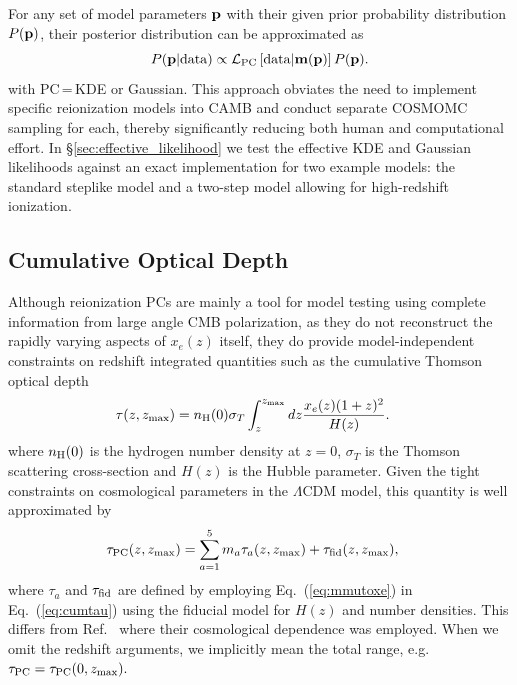 \documentclass[prd,twocolumn,amsmath,amssymb,floatfix,superscriptaddress,nofootinbib]{revtex4-1}
\begin{document}
For any set of model parameters ${\bf p}$ with their given prior probability distribution
$P({\bf p})$, their posterior distribution can be approximated as 
\begin{equation}
P({\bf p}| {\rm data}) \propto {\cal L}_{\rm PC}\left[ {\rm data}|\mathbf{m}(\bf p) \right] P(\bf p).
\end{equation}
with PC\,=\,KDE or Gaussian.
This approach obviates the need to implement specific reionization models into CAMB and conduct separate COSMOMC sampling for each, thereby significantly reducing both human and computational effort.
In \S\ref{sec:effective_likelihood} we test the effective KDE and Gaussian likelihoods against an exact implementation
for two example models: the standard steplike model and a two-step model allowing for high-redshift ionization.


%
%
%
 
\subsection{Cumulative Optical Depth}
\label{sec:cumulative}

Although reionization PCs are mainly a tool for model testing using complete information from large angle CMB polarization, as they do not reconstruct the rapidly varying aspects of $x_e(z)$ itself, they do provide model-independent constraints on redshift integrated quantities such as  the cumulative Thomson optical depth
\begin{align}
\tau(z,z_{\rm max}) & = n_{\rm H}(0) \sigma_T \int_z^{z_{\rm max}} dz \frac{x_e(z) (1+z)^{2} }{H(z)}.
\label{eq:cumtau}
\end{align}
where $n_{\rm H}(0)$ is the hydrogen number density at $z=0$, $\sigma_T$ is the Thomson scattering cross-section and $H(z)$ is the Hubble parameter. 
Given the tight constraints on cosmological parameters in the $\Lambda$CDM model, this quantity is well approximated by
\begin{align}
\tau_{\rm PC}(z,z_{\rm max})& = \sum_{a=1}^5 m_a \tau_a(z,z_{\rm max}) + \tau_{\rm fid}(z,z_{\rm max}),
\label{eq:cumtauPC}
\end{align}
where $\tau_a$ and $\tau_{\rm fid}$ are defined by employing Eq.~({\ref{eq:mmutoxe}}) in
Eq.~(\ref{eq:cumtau}) using the fiducial model 
for $H(z)$ and number densities.  This differs from Ref.~\cite{Heinrich:2016ojb} where their cosmological dependence was employed.
 When we omit the redshift arguments, we
implicitly mean the total range, e.g. 
 $
 \tau_{\rm PC}=\tau_{\rm PC}(0,z_{\rm max}).
 $
 
\end{document}
